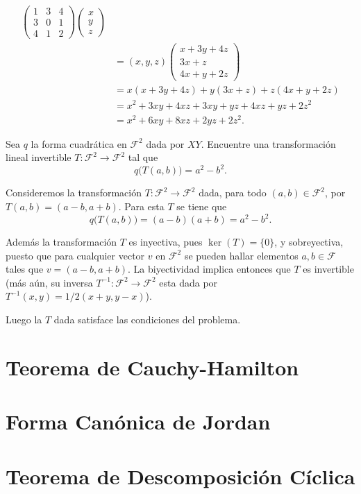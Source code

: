 \documentclass[twocolumn]{notasdeclase}
\newcommand{\F}{\mathcal{F}}
\newcommand{\inv}{^{-1}}
\begin{document}
\begin{sol}
\begin{align*}
\begin{pmatrix}
			1 & 3 &4 \\
			3 & 0 & 1\\
			4 & 1 & 2
			\end{pmatrix}\begin{pmatrix}
			x \\ y \\ z
			\end{pmatrix} \\
			&= (x,y,z)\begin{pmatrix}
			x+3y+4z \\
			3x+z\\
			4x+y+2z
			\end{pmatrix} \\
			&= x(x+3y+4z) + y(3x+z) + z(4x+y+2z) \\
			&= x^2+3xy+4xz + 3xy + yz + 4xz + yz + 2z^2 \\
			&= x^2 +6xy+8xz+2yz+2z^2.
	\end{align*}
\end{sol}
\begin{ejer}
	Sea $q$ la forma cuadrática en $\F^2$ dada por $XY$. Encuentre una transformación lineal invertible $T:\F^2\to\F^2$ tal que
	\[ q\big(T(a,b)\big) = a^2-b^2. \]
\end{ejer}
\begin{sol}
	Consideremos la transformación $T:\F^2\to\F^2$ dada, para todo $(a,b)\in\F^2$, por $T(a,b) = (a-b,a+b)$. Para esta $T$ se tiene que 
	\[ q\big(T(a,b)\big) = (a-b)(a+b) = a^2-b^2. \]
	
	Además la transformación $T$ es inyectiva, pues $\ker(T)=\{0\}$, y sobreyectiva, puesto que para cualquier vector $v$ en $\F^2$ se pueden hallar elementos $a,b\in\F$ tales que $v=(a-b,a+b)$. La biyectividad implica entonces que $T$ es invertible (más aún, su inversa $T\inv:\F^2\to\F^2$ esta dada por $T\inv(x,y) = 1/2(x+y,y-x)$).
	
	Luego la $T$ dada satisface las condiciones del problema.
\end{sol}
\chapter[teorema de cauchy-hamilton]{Teorema de Cauchy-Hamilton}

\chapter[forma canónica de jordan]{Forma Canónica de Jordan}

\chapter[teorema de descomposición cíclica]{Teorema de Descomposición Cíclica}

\backmatter
\end{document}
